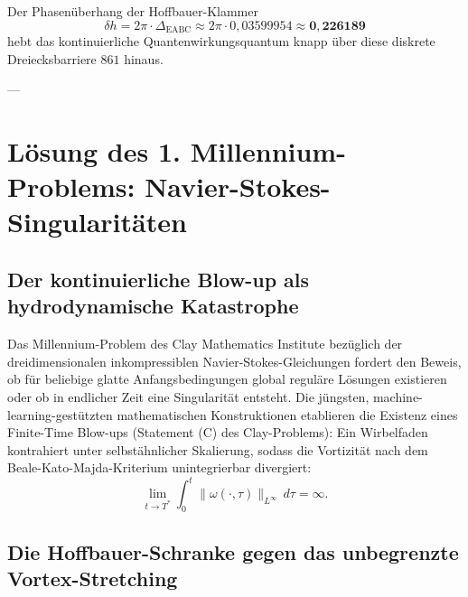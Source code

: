 \documentclass[11pt,a4paper]{article}
\theoremstyle{definition}
\theoremstyle{remark}
\numberwithin{equation}{section}
\begin{document}
Der Phasenüberhang der Hoffbauer-Klammer
\begin{equation}
\delta h = 2\pi \cdot \Delta_{\mathrm{EABC}} \approx 2\pi \cdot 0{,}03599954 \approx \mathbf{0{,}226189}
\end{equation}
hebt das kontinuierliche Quantenwirkungsquantum knapp über diese diskrete Dreiecksbarriere $861$ hinaus.

---

\section{Lösung des 1. Millennium-Problems: Navier-Stokes-Singularitäten}

\subsection{Der kontinuierliche Blow-up als hydrodynamische Katastrophe}

Das Millennium-Problem des Clay Mathematics Institute bezüglich der dreidimensionalen inkompressiblen Navier-Stokes-Gleichungen fordert den Beweis, ob für beliebige glatte Anfangsbedingungen global reguläre Lösungen existieren oder ob in endlicher Zeit eine Singularität entsteht. Die jüngsten, machine-learning-gestützten mathematischen Konstruktionen etablieren die Existenz eines Finite-Time Blow-ups (Statement (C) des Clay-Problems): Ein Wirbelfaden kontrahiert unter selbstähnlicher Skalierung, sodass die Vortizität nach dem Beale-Kato-Majda-Kriterium unintegrierbar divergiert:
\begin{equation}
\lim_{t \to T^*} \int_0^t \|\omega(\cdot, \tau)\|_{L^\infty} \, d\tau = \infty.
\end{equation}

\subsection{Die Hoffbauer-Schranke gegen das unbegrenzte Vortex-Stretching}
\end{document}
